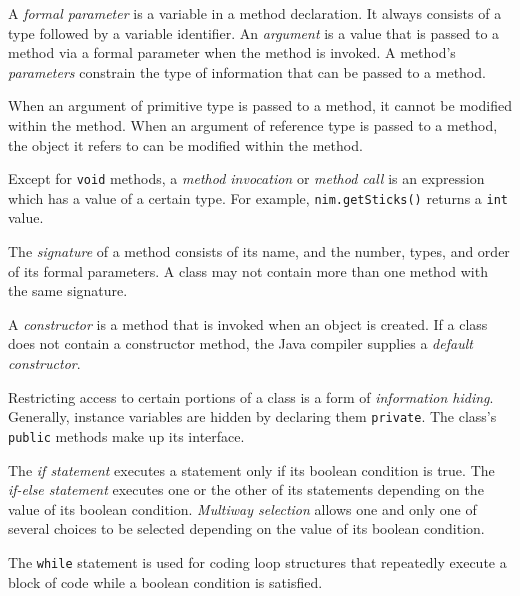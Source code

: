 \begin{SMBL}
\item  A {\it formal parameter} is a variable in a method
declaration. It always consists of a type followed by a variable
identifier.  An {\it argument} is a value that is passed to a method
via a formal parameter when the method is invoked.   A method's
{\it parameters} constrain the type of information that can be passed to a
method.

\item  When an argument of primitive type is passed to a method, 
it cannot be modified within the method.  When an argument of
reference type is passed to a method, the object it refers to can be
modified within the method.

\item  Except for {\tt void} methods,
a {\it method invocation} or {\it method call} is an expression which
has a value of a certain type.  For example, {\tt nim.getSticks()}
returns a {\tt int} value.

\item  The {\it signature} of a method consists
of its name, and the number, types, and order of its formal
parameters.  A class may not contain more than one method with the same
signature.

\item  A {\it constructor} is a method that is invoked
when an object is created.  If a class does not contain a
constructor method, the Java compiler supplies a {\it default
constructor}.

\item  Restricting access to certain portions of a class is a form of
{\it information hiding}.
Generally, instance variables are hidden by declaring them
{\tt private}.  The class's {\tt public} methods make up its interface.

\item  The {\it if statement} executes a statement only if its boolean
condition is true.  The {\it if-else statement} executes one
or the other of its statements depending on the value of its boolean
condition.   {\it Multiway selection} allows one and only one of
several choices to be selected depending on the value of its boolean
condition.

\item  The {\tt while} statement is used for coding loop structures
that repeatedly execute a block of code while a boolean condition
is satisfied.

\end{SMBL}

